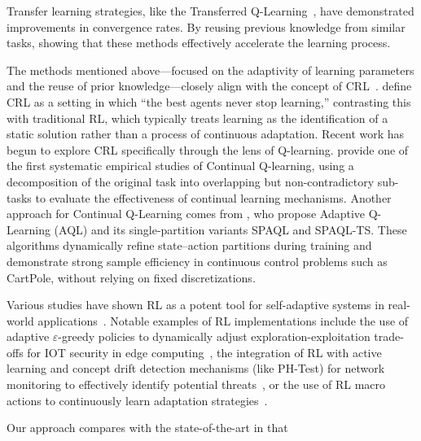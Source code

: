 Transfer learning strategies, like the Transferred Q-Learning~\cite{chen2022transferredqlearning}, 
have demonstrated improvements in convergence rates. By reusing previous knowledge from similar 
tasks, showing that these methods effectively accelerate the learning process.

The methods mentioned above—focused on the adaptivity of learning parameters and the reuse of prior knowledge—closely align with the concept of \ac{CRL}~\cite{khetarpal2022continualreinforcementlearningreview}.
\citet{abel2023definitioncontinualreinforcementlearning} define \ac{CRL} as a setting in which “the best agents never stop learning,” contrasting this with traditional \ac{RL}, which typically treats learning as the identification of a static solution rather than a process of continuous adaptation.
Recent work has begun to explore \ac{CRL} specifically through the lens of Q-learning.
\citet{Bagus2022} provide one of the first systematic empirical studies of Continual Q-learning, using a decomposition of the original task into overlapping but non-contradictory sub-tasks to evaluate the effectiveness of continual learning mechanisms.
Another approach for Continual Q-Learning comes from \citet{araujo2020controladaptiveqlearning}, who propose Adaptive Q-Learning (AQL) and its single-partition variants SPAQL and SPAQL-TS. These algorithms dynamically refine state–action partitions during training and demonstrate strong sample efficiency in continuous control problems such as CartPole, without relying on fixed discretizations.

Various studies have shown \ac{RL} as a potent tool for self-adaptive systems in real-world 
applications~\cite{HENRICHS2022106940}. Notable examples of \ac{RL} implementations 
include the use of adaptive $\varepsilon$-greedy policies to dynamically adjust exploration-exploitation 
trade-offs for \ac{IOT} security in edge computing~\cite{iotdynamicrl}, the integration of \ac{RL} 
with active learning and concept drift detection mechanisms (like PH-Test) for network monitoring to 
effectively identify potential threats~\cite{networkdynamicrl}, or the use of \ac{RL} macro actions to 
continuously learn adaptation strategies~\cite{cardozo23}.

Our approach compares with the state-of-the-art in that 


\endinput
